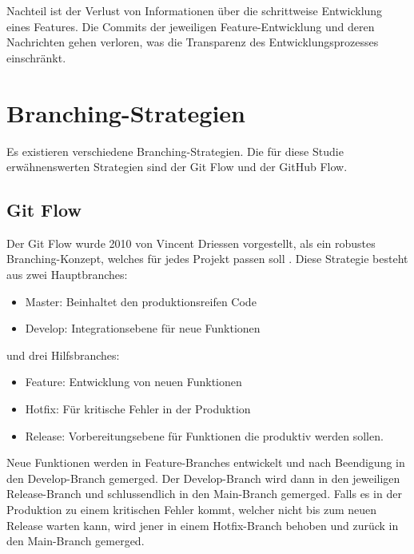 Nachteil ist der Verlust von Informationen über die schrittweise Entwicklung eines Features. Die Commits der jeweiligen Feature-Entwicklung und deren Nachrichten gehen verloren, was die Transparenz des Entwicklungsprozesses einschränkt. \parencite{codoban_comparative_2015}

\section{Branching-Strategien}
Es existieren verschiedene Branching-Strategien. Die für diese Studie erwähnenswerten Strategien sind der Git Flow und der GitHub Flow. \parencite{priyanka_gowdaashwath_narayana_gowda_git-branching-and-release-strategies_2022} 
\subsection{Git Flow}
\label{sec:GitFlow}
Der Git Flow wurde 2010 von Vincent Driessen vorgestellt, als ein robustes Branching-Konzept, welches für jedes Projekt passen soll \parencite{priyanka_gowdaashwath_narayana_gowda_git-branching-and-release-strategies_2022}.
Diese Strategie besteht aus zwei Hauptbranches:
\begin{itemize}
    \item Master: Beinhaltet den produktionsreifen Code  
    \item Develop: Integrationsebene für neue Funktionen
\end{itemize}
und drei Hilfsbranches:
\begin{itemize}
    \item Feature: Entwicklung von neuen Funktionen
    \item Hotfix: Für kritische Fehler in der Produktion
    \item Release: Vorbereitungsebene für Funktionen die produktiv werden sollen.
\end{itemize}
Neue Funktionen werden in Feature-Branches entwickelt und nach Beendigung in den Develop-Branch gemerged. Der Develop-Branch wird dann in den jeweiligen Release-Branch und schlussendlich in den Main-Branch gemerged. Falls es in der Produktion zu einem kritischen Fehler kommt, welcher nicht bis zum neuen Release warten kann, wird jener in einem Hotfix-Branch behoben und zurück in den Main-Branch gemerged.
\parencite{priyanka_gowdaashwath_narayana_gowda_git-branching-and-release-strategies_2022}

